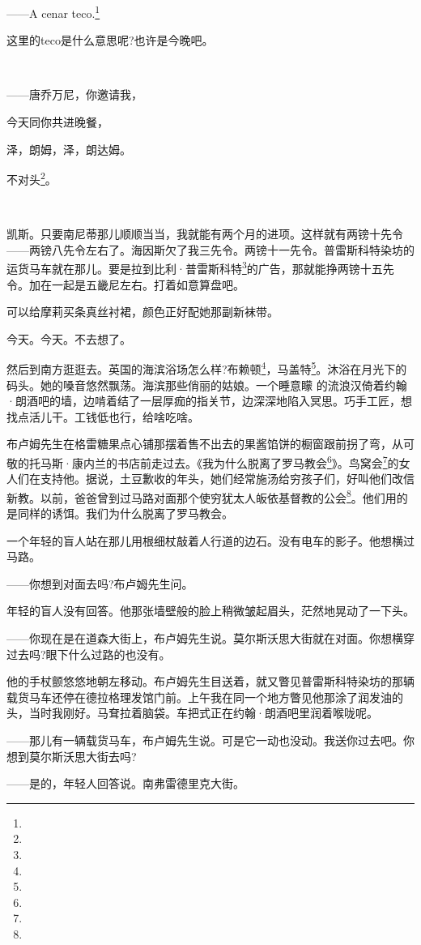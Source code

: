 \par ——A cenar teco.\footnote{}
\par 这里的teco是什么意思呢?也许是今晚吧。
\par  
\par ——唐乔万尼，你邀请我，
\par 今天同你共进晚餐，
\par 泽，朗姆，泽，朗达姆。
\par 不对头\footnote{}。
\par  
\par 凯斯。只要南尼蒂那儿顺顺当当，我就能有两个月的进项。这样就有两镑十先令——两镑八先令左右了。海因斯欠了我三先令。两镑十一先令。普雷斯科特染坊的运货马车就在那儿。要是拉到比利·普雷斯科特\footnote{}的广告，那就能挣两镑十五先令。加在一起是五畿尼左右。打着如意算盘吧。
\par 可以给摩莉买条真丝衬裙，颜色正好配她那副新袜带。
\par 今天。今天。不去想了。
\par 然后到南方逛逛去。英国的海滨浴场怎么样?布赖顿\footnote{}，马盖特\footnote{}。沐浴在月光下的码头。她的嗓音悠然飘荡。海滨那些俏丽的姑娘。一个睡意矇 的流浪汉倚着约翰·朗酒吧的墙，边啃着结了一层厚痂的指关节，边深深地陷入冥思。巧手工匠，想找点活儿干。工钱低也行，给啥吃啥。
\par 布卢姆先生在格雷糖果点心铺那摆着售不出去的果酱馅饼的橱窗跟前拐了弯，从可敬的托马斯·康内兰的书店前走过去。《我为什么脱离了罗马教会\footnote{}》。鸟窝会\footnote{}的女人们在支持他。据说，土豆歉收的年头，她们经常施汤给穷孩子们，好叫他们改信新教。以前，爸爸曾到过马路对面那个使穷犹太人皈依基督教的公会\footnote{}。他们用的是同样的诱饵。我们为什么脱离了罗马教会。
\par 一个年轻的盲人站在那儿用根细杖敲着人行道的边石。没有电车的影子。他想横过马路。
\par ——你想到对面去吗?布卢姆先生问。
\par 年轻的盲人没有回答。他那张墙壁般的脸上稍微皱起眉头，茫然地晃动了一下头。
\par ——你现在是在道森大街上，布卢姆先生说。莫尔斯沃思大街就在对面。你想横穿过去吗?眼下什么过路的也没有。
\par 他的手杖颤悠悠地朝左移动。布卢姆先生目送着，就又瞥见普雷斯科特染坊的那辆载货马车还停在德拉格理发馆门前。上午我在同一个地方瞥见他那涂了润发油的头，当时我刚好。马耷拉着脑袋。车把式正在约翰·朗酒吧里润着喉咙呢。
\par ——那儿有一辆载货马车，布卢姆先生说。可是它一动也没动。我送你过去吧。你想到莫尔斯沃思大街去吗?
\par ——是的，年轻人回答说。南弗雷德里克大街。
